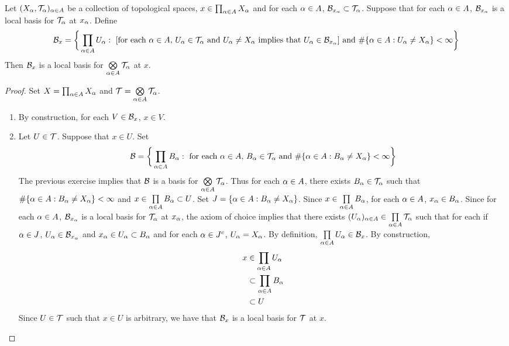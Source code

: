 \documentclass{book}
\begin{document}
	\begin{ex}  
		Let $(X_{\alpha}, \mathcal{T}_{\alpha})_{\alpha \in A}$ be a collection of topological spaces, $x \in \prod_{\alpha \in A}X_{\alpha}$ and for each $\alpha \in A$, $\mathcal{B}_{x_{\alpha}} \subset \mathcal{T}_{\alpha}$. Suppose that for each $\alpha \in A$, $\mathcal{B}_{x_{\alpha}}$ is a local basis for $\mathcal{T}_{\alpha}$ at $x_{\alpha}$. Define 
		$$\mathcal{B}_x = \bigg \{\prod_{\alpha \in A} U_{\alpha}: \text{ [for each $\alpha \in A$, $U_{\alpha} \in \mathcal{T}_{\alpha}$ and $U_{\alpha} \neq X_{\alpha}$ implies that $U_{\alpha} \in \mathcal{B}_{x_{\alpha}}$] and $\# \{\alpha \in A: U_{\alpha} \neq X_{\alpha}\} < \infty$} \bigg\}$$
		Then $\mathcal{B}_x$ is a local basis for $\bigotimes\limits_{\alpha \in A} \mathcal{T}_{\alpha}$ at $x$.
	\end{ex}

	\begin{proof}Set $X = \prod_{\alpha \in A}X_{\alpha}$ and $\mathcal{T} = \bigotimes\limits_{\alpha \in A} \mathcal{T}_{\alpha}$.
		\begin{enumerate}
			\item By construction, for each $V \in \mathcal{B}_x$, $x \in V$. 
			\item Let $U \in \mathcal{T}$. Suppose that $x \in U$. Set 
			$$\mathcal{B} = \bigg \{\prod_{\alpha \in A}B_{\alpha}: \text{ for each $\alpha \in A$,  $B_{\alpha} \in \mathcal{T}_{\alpha}$ and $\# \{\alpha \in A: B_{\alpha} \neq X_{\alpha}\} < \infty$} \bigg\}$$
			The previous exercise implies that $\mathcal{B}$ is a basis for $\bigotimes\limits_{\alpha \in A} \mathcal{T}_{\alpha}$. Thus for each $\alpha \in A$, there exists $B_{\alpha} \in \mathcal{T}_{\alpha}$ such that $\# \{\alpha \in A: B_{\alpha} \neq X_{\alpha}\} < \infty$ and $x \in \prod\limits_{\alpha \in A} B_{\alpha} \subset U$. Set $J = \{\alpha \in A: B_{\alpha} \neq X_{\alpha}\}$. Since $x \in \prod\limits_{\alpha \in A} B_{\alpha}$, for each $\alpha \in A$, $x_{\alpha} \in B_{\alpha}$. Since for each $\alpha \in A$, $\mathcal{B}_{x_{\alpha}}$ is a local basis for $\mathcal{T}_{\alpha}$ at $x_{\alpha}$, the axiom of choice implies that there exists $(U_{\alpha})_{\alpha \in A} \in \prod\limits_{\alpha \in A} \mathcal{T}_{\alpha}$ such that for each if $\alpha \in J$, $U_{\alpha} \in \mathcal{B}_{x_{\alpha}}$ and $x_{\alpha} \in U_{\alpha} \subset B_{\alpha}$ and  for each $\alpha \in J^c$, $U_{\alpha} = X_{\alpha}$. By definition, $\prod\limits_{\alpha \in A} U_{\alpha} \in \mathcal{B}_x$. By construction, 
			\begin{align*}
				x 
				& \in \prod_{\alpha \in A} U_{\alpha} \\
				& \subset \prod_{\alpha \in A} B_{\alpha} \\
				& \subset U
			\end{align*}
			Since $U \in \mathcal{T}$ such that $x \in U$ is arbitrary, we have that $\mathcal{B}_x$ is a local basis for $\mathcal{T}$ at $x$. 
		\end{enumerate}
	\end{proof}
\end{document}
